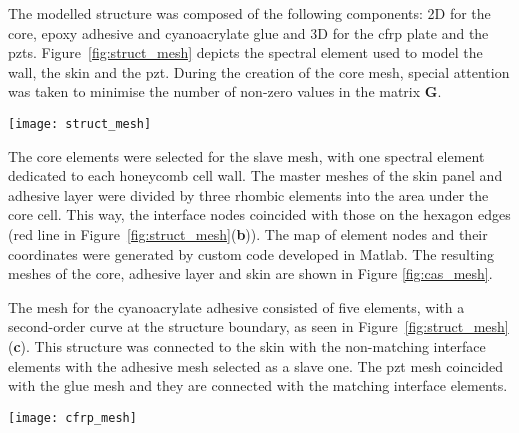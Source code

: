 \documentclass[a4paper,fleqn]{cas-dc}
\begin{document}
The modelled structure was composed of the following components: 2D for the core, epoxy adhesive and cyanoacrylate glue and 3D for the \ac{cfrp} plate and the \acp{pzt}.
Figure~\ref{fig:struct_mesh} depicts the spectral element used to model the wall, the skin and the \ac{pzt}.
During the creation of the core mesh, special attention was taken to minimise the number of non-zero values in the matrix \(\textbf{G}\).
\begin{figure*}
	\begin{center}
		\texttt{[image: struct\_mesh]}
	\end{center}
	\caption{The mesh with the nodes distribution, (\textbf{a}) spectral element used for modeling the wall of the core, (\textbf{b}) excerpt of the skin plate and (\textbf{c}) cyanoacrylate glue mesh with the second-order curve at the boundary}
	\label{fig:struct_mesh}
\end{figure*}

The core elements were selected for the slave mesh, with one spectral element dedicated to each honeycomb cell wall.
The master meshes of the skin panel and adhesive layer were divided by three rhombic elements into the area under the core cell.
This way, the interface nodes coincided with those on the hexagon edges (red line in Figure~\ref{fig:struct_mesh}(\textbf{b})).
The map of element nodes and their coordinates were generated by custom code developed in Matlab.
The resulting meshes of the core, adhesive layer and skin are shown in Figure \ref{fig:cas_mesh}.

The mesh for the cyanoacrylate adhesive consisted of five elements, with a second-order curve at the structure boundary, as seen in Figure~\ref{fig:struct_mesh}(\textbf{c}).
This structure was connected to the skin with the non-matching interface elements with the adhesive mesh selected as a slave one.
The \ac{pzt} mesh coincided with the glue mesh and they are connected with the matching interface elements.

\begin{figure*}
	\begin{center}
		\texttt{[image: cfrp\_mesh]}
	\end{center}
	\caption{The meshes of \acl{hsc} components and the interfaces between them}
	\label{fig:cas_mesh}
\end{figure*}

\end{document}
